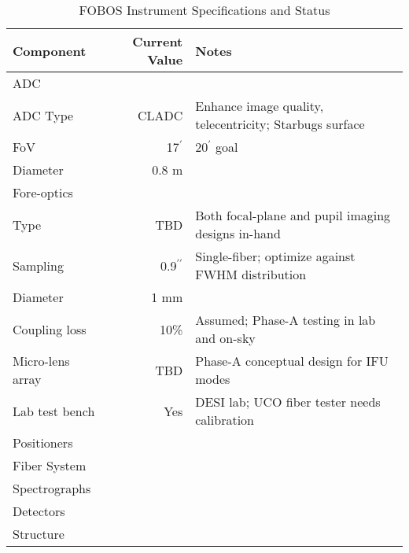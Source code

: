 \begin{table}[h!]
\centering
\footnotesize
\caption{FOBOS Instrument Specifications and Status}
\label{tab:specs}
\vspace*{-10pt}
\begin{tabular}{l r l}
Component                     & Current Value & Notes \\
\hline
ADC \\
\hline
\hspace{0.2cm} ADC Type & CLADC & Enhance image quality, telecentricity; Starbugs surface \\
\hspace{0.2cm} FoV & 17$^\prime$ & 20$^\prime$ goal \\
\hspace{0.2cm} Diameter & 0.8 m & \\
\hline
Fore-optics \\
\hline
\hspace{0.2cm} Type & TBD & Both focal-plane and pupil imaging designs in-hand \\
\hspace{0.2cm} Sampling & 0.9$^{\prime\prime}$ & Single-fiber; optimize against FWHM distribution \\
\hspace{0.2cm} Diameter & 1 mm & \\
\hspace{0.2cm} Coupling loss & 10\% & Assumed; Phase-A testing in lab and on-sky\\
\hspace{0.2cm} Micro-lens array & TBD & Phase-A conceptual design for IFU modes \\
\hspace{0.2cm} Lab test bench & Yes & DESI lab; UCO fiber tester needs calibration \\
\hline
Positioners \\
\hline
\hline
Fiber System \\
\hline
\hline
Spectrographs \\
\hline
\hline
Detectors \\
\hline
\hline
Structure \\
\hline
\hline



\end{tabular}
\end{table}


